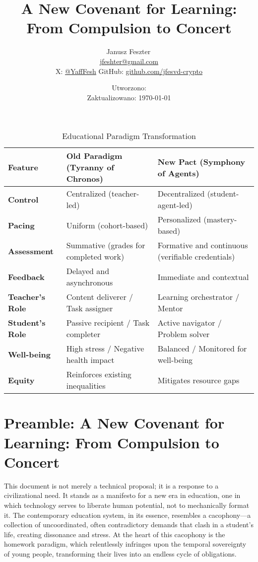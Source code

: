\documentclass[12pt,a4paper]{article}
\title{A New Covenant for Learning: From Compulsion to Concert}
\author{Janusz Feszter\,\orcidlink{0009-0002-1330-7530}\\
\small \href{mailto:jfeshter@gmail.com}{jfeshter@gmail.com}\\
\small X: \href{https://x.com/YaffFesh}{@YaffFesh} \quad
\small GitHub: \href{https://github.com/jfesvd-crypto}{github.com/jfesvd-crypto}
}
\date{Utworzono: \createddate\\Zaktualizowano: \today}
\begin{document}
\maketitle
\tableofcontents
\newpage

\begin{table}[htbp]
\centering
\caption{Educational Paradigm Transformation}
\label{tab:paradigm_shift}
\small
\begin{tabularx}{\textwidth}{@{}lXX@{}}
\toprule
\textbf{Feature} & \textbf{Old Paradigm (Tyranny of Chronos)} & \textbf{New Pact (Symphony of Agents)} \\
\midrule
\textbf{Control}    & Centralized (teacher-led)                 & Decentralized (student-agent-led) \\
\textbf{Pacing}     & Uniform (cohort-based)                    & Personalized (mastery-based) \\
\textbf{Assessment} & Summative (grades for completed work)     & Formative and continuous (verifiable credentials) \\
\textbf{Feedback}   & Delayed and asynchronous                  & Immediate and contextual \\
\textbf{Teacher's Role} & Content deliverer / Task assigner      & Learning orchestrator / Mentor \\
\textbf{Student's Role} & Passive recipient / Task completer     & Active navigator / Problem solver \\
\textbf{Well-being} & High stress / Negative health impact      & Balanced / Monitored for well-being \\
\textbf{Equity}     & Reinforces existing inequalities          & Mitigates resource gaps \\
\bottomrule
\end{tabularx}
\end{table}

\section*{Preamble: A New Covenant for Learning: From Compulsion to Concert}
This document is not merely a technical proposal; it is a response to a civilizational need. It stands as a manifesto for a new era in education, one in which technology serves to liberate human potential, not to mechanically format it. The contemporary education system, in its essence, resembles a cacophony---a collection of uncoordinated, often contradictory demands that clash in a student's life, creating dissonance and stress. At the heart of this cacophony is the homework paradigm, which relentlessly infringes upon the temporal sovereignty of young people, transforming their lives into an endless cycle of obligations.
\end{document}

